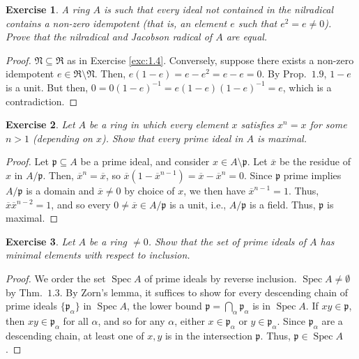 \documentclass[12pt,letterpaper]{article}
\newtheorem{problem}{Exercise}[section]
\theoremstyle{definition}
\theoremstyle{remark}
\numberwithin{figure}{problem}
\numberwithin{equation}{section}
\DeclareMathOperator{\Spec}{Spec}
\begin{document}
\begin{problem}
  A ring
  $A$ is such that every ideal not contained in the nilradical contains a non-zero idempotent (that is, an element
  $e$ such that
  $e^2 = e \ne
  0$).
  Prove that the nilradical and Jacobson radical of
  $A$ are equal.
\end{problem}
\begin{proof}
  $\mathfrak{N} \subseteq
  \mathfrak{R}$ as in Exercise \ref{exc:1.4}.
  Conversely, suppose there exists a non-zero idempotent
  $e \in \mathfrak{R} \setminus
  \mathfrak{N}$.
  Then,
  $e(1-e) = e - e^2 = e-e =
  0$.
  By
  Prop.~$1.9$,
  $1-e$ is a unit.
  But then,
  $0 = 0(1-e)^{-1} = e(1-e)(1-e)^{-1} =
  e$, which is a contradiction.
\end{proof}

\begin{problem}\label{exc:1.7}
  Let
  $A$ be a ring in which every element
  $x$ satisfies
  $x^n =
  x$ for some
  $n >
  1$ (depending on
  $x$).
  Show that every prime ideal in
  $A$ is maximal.
\end{problem}
\begin{proof}
  Let
  $\mathfrak{p} \subseteq
  A$ be a prime ideal, and consider
  $x \in A \setminus
  \mathfrak{p}$.
  Let
  $\overline{x}$ be the residue of
  $x$ in
  $A/\mathfrak{p}$.
  Then,
  $\overline{x}^n =
  \overline{x}$, so
  $\overline{x}(1-\overline{x}^{n-1}) = \overline{x} - \overline{x}^n =
  0$.
  Since
  $\mathfrak{p}$ prime implies
  $A/\mathfrak{p}$ is a domain and
  $\overline{x} \ne
  0$ by choice of
  $x$, we then have
  $\overline{x}^{n-1} =
  1$.
  Thus,
  $\overline{x}\overline{x}^{n-2} =
  1$, and so every
  $0 \ne \overline{x} \in
  A/\mathfrak{p}$ is a unit, i.e.,
  $A/\mathfrak{p}$ is a field.
  Thus,
  $\mathfrak{p}$ is maximal.
\end{proof}

\begin{problem}\label{exc:1.8}
  Let
  $A$ be a ring
  $\ne
  0$.
  Show that the set of prime ideals of
  $A$ has minimal elements with respect to inclusion.
\end{problem}
\begin{proof}
  We order the set
  $\Spec
  A$ of prime ideals by reverse inclusion.
  $\Spec A \ne
  \emptyset$ by
  Thm.~$1.3$.
  By Zorn's lemma, it suffices to show for every descending chain of prime ideals
  $\{\mathfrak{p}_\alpha\}$ in
  $\Spec
  A$, the lower bound
  $\mathfrak{p} = \bigcap_\alpha
  \mathfrak{p}_\alpha$ is in
  $\Spec
  A$.
  If
  $xy \in
  \mathfrak{p}$, then
  $xy \in
  \mathfrak{p}_\alpha$ for all
  $\alpha$, and so for any
  $\alpha$, either
  $x \in
  \mathfrak{p}_\alpha$ or
  $y \in
  \mathfrak{p}_\alpha$.
  Since
  $\mathfrak{p}_\alpha$ are a descending chain, at least one of
  $x,y$ is in the intersection
  $\mathfrak{p}$.
  Thus,
  $\mathfrak{p} \in \Spec
  A$.
\end{proof}
\end{document}
